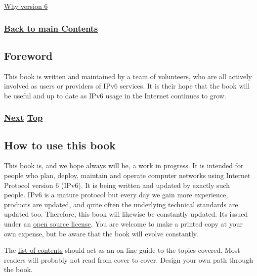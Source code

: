 \documentclass[
]{article}
\begin{document}
\hyperref[why-version-6]{Why version 6}

\subsubsection{\texorpdfstring{\hyperref[list-of-contents]{Back to main
Contents}}{Back to main Contents}}\label{back-to-main-contents}

\pagebreak

\subsection{Foreword}\label{foreword}

This book is written and maintained by a team of volunteers, who are all
actively involved as users or providers of IPv6 services. It is their
hope that the book will be useful and up to date as IPv6 usage in the
Internet continues to grow.

\subsubsection{\texorpdfstring{\hyperref[how-to-use-this-book]{Next}
\hyperref[introduction-and-foreword]{Top}}{Next Top}}\label{next-top}

\pagebreak

\subsection{How to use this book}\label{how-to-use-this-book}

This book is, and we hope always will be, a work in progress. It is
intended for people who plan, deploy, maintain and operate computer
networks using Internet Protocol version 6 (IPv6). It is being written
and updated by exactly such people. IPv6 is a mature protocol but every
day we gain more experience, products are updated, and quite often the
underlying technical standards are updated too. Therefore, this book
will likewise be constantly updated. It\textquotesingle s issued under
an \href{https://github.com/becarpenter/book6/blob/main/LICENSE.md}{open
source license}. You are welcome to make a printed copy at your own
expense, but be aware that the book will evolve constantly.

The \hyperref[list-of-contents]{list of contents} should act as an
on-line guide to the topics covered. Most readers will probably not read
from cover to cover. Design your own path through the book.
\end{document}
